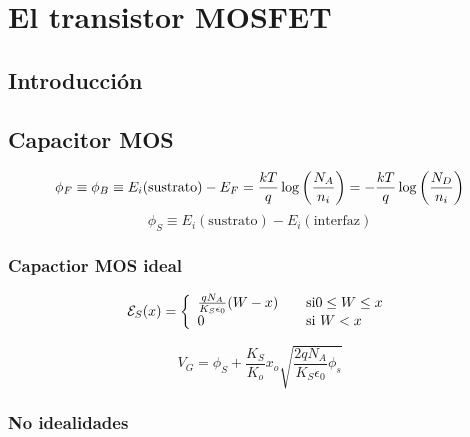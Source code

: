 \chapter{El transistor MOSFET}

\section{Introducción}

\lipsum[1]

\section{Capacitor MOS}

\lipsum[1-2]

\begin{equation*}
	\phi_F \equiv \phi_B \equiv E_i(\text{sustrato}) - E_F 
    = \frac{kT}{q} \log \left( \frac{N_A}{n_i} \right) = -\frac{kT}{q} \log \left( \frac{N_D}{n_i} \right) 
\end{equation*}
\begin{equation*}
	\phi_S \equiv E_i(\text{sustrato}) - E_i (\text{interfaz}) 
\end{equation*}

\subsection{Capactior MOS ideal}

\lipsum[1-2]




\begin{equation*}
	\mathcal{E}_S (x) = \left\lbrace \begin{array}{ll}
		\frac{qN_A}{K_S \epsilon_0} (W-x) & \quad \text{si} 0\leq W \leq x \\
		0 & \quad \text{si} \ W<x 
	\end{array} \right.
\end{equation*}



\begin{equation*}
	V_G = \phi_S + \frac{K_S}{K_o} x_o \sqrt{\frac{2qN_A}{K_S\epsilon_0} \phi_s}
\end{equation*}

\subsection{No idealidades}

\lipsum[1-2]
